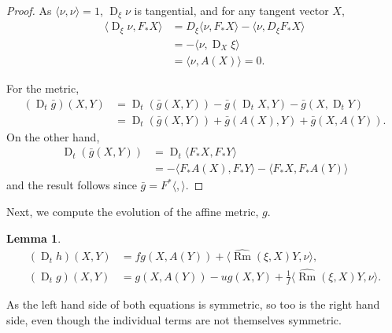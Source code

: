 \documentclass{amsart}
\newtheorem{lemma}[theorem]{Lemma}
\theoremstyle{definition}
\theoremstyle{remark}
\newcommand{\ip}[2]{\ensuremath{\langle{#1},{#2}\rangle}}
\DeclareMathOperator{\Rm}{Rm}
\DeclareMathOperator{\D}{D}
\numberwithin{equation}{section}
\begin{document}
\begin{proof}
As $\ip{\nu}{\nu} = 1$, $\D_{\xi} \nu$ is tangential, and for any tangent vector $X$,
\[
\begin{split}
\ip{\D_{\xi} \nu}{F_{\ast} X} &= D_{\xi} \ip{\nu}{F_{\ast}X} - \ip{\nu}{D_{\xi} F_{\ast} X} \\
&= -\ip{\nu}{\D_{X}\xi} \\
&= \ip{\nu}{A(X)} = 0.
\end{split}
\]

For the metric,
\[
\begin{split}
\left(\D_t \bar{g}\right) (X, Y) &= \D_t (\bar{g}(X, Y)) - \bar{g}(\D_t X, Y) - \bar{g}(X, \D_t Y) \\
&= \D_t (\bar{g}(X, Y)) + \bar{g}(A(X), Y) + \bar{g}(X, A(Y)).
\end{split}
\]
On the other hand,
\[
\begin{split}
\D_t (\bar{g}(X, Y)) &= \D_t \ip{F_{\ast} X}{F_{\ast} Y} \\
&= -\ip{F_{\ast} A(X)}{F_{\ast} Y} - \ip{F_{\ast} X}{F_{\ast} A(Y)}
\end{split}
\]
and the result follows since $\bar{g} = F^{\ast} \ip{}{}$.
\end{proof}

Next, we compute the evolution of the affine metric, $g$.

\begin{lemma}
\label{lem:metric}
\begin{align*}
(\D_t h) (X, Y) &= f g(X, A(Y)) + \ip{\widehat{\Rm}(\xi, X) Y}{\nu}, \\
(\D_t g) (X, Y) &= g(X, A(Y)) - u g(X, Y) + \frac{1}{f} \ip{\widehat{\Rm}(\xi, X) Y}{\nu}.
\end{align*}
\end{lemma}

As the left hand side of both equations is symmetric, so too is the right hand side, even though the individual terms are not themselves symmetric.
\end{document}
